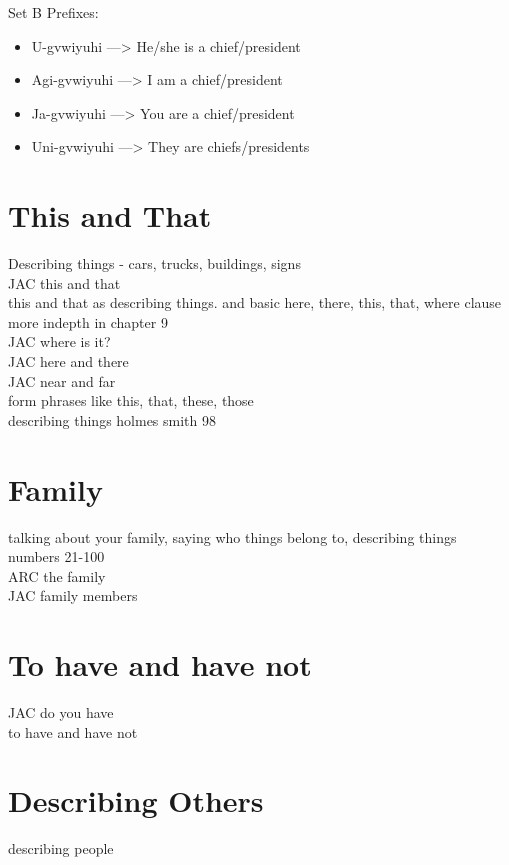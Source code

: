 \noindent Set B Prefixes:
\begin{itemize}
\item U-gvwiyuhi —> He/she is a chief/president
\item Agi-gvwiyuhi —> I am a chief/president
\item Ja-gvwiyuhi —> You are a chief/president
\item Uni-gvwiyuhi —> They are chiefs/presidents
\end{itemize}
\chapter{This and That}
Describing things - cars, trucks, buildings, signs\\
JAC this and that\\
this and that as describing things.  and basic here, there, this, that, where clause\\
more indepth in chapter 9\\
JAC where is it?\\
JAC here and there\\
JAC near and far\\
form phrases like this, that, these, those\\
describing things holmes smith 98\\
\chapter{Family}
talking about your family, saying who things belong to, describing things\\
numbers 21-100\\
ARC the family\\
JAC family members\\
\chapter{To have and have not}
JAC do you have\\
to have and have not\\
\chapter{Describing Others}
describing people\\
